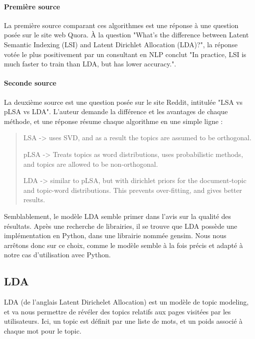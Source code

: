 			\paragraph{Première source} 

				La première source comparant ces algorithmes est une réponse à une question posée sur le site web Quora\cite{quora-topicmodel}. À la question "What's the difference between Latent Semantic Indexing (LSI) and Latent Dirichlet Allocation (LDA)?", la réponse votée le plus positivement par un consultant en NLP conclut "In practice, LSI is much faster to train than LDA, but has lower accuracy.".

			\paragraph{Seconde source}

				La deuxième source est une question posée sur le site Reddit, intitulée "LSA vs pLSA vs LDA"\cite{reddit-topicmodel}. L'auteur demande la différence et les avantages de chaque méthode, et une réponse résume chaque algorithme en une simple ligne :
				\begin{quote}
LSA -> uses SVD, and as a result the topics are assumed to be orthogonal.

pLSA -> Treats topics as word distributions, uses probabilistic methods, and topics are allowed to be non-orthogonal.

LDA -> similar to pLSA, but with dirichlet priors for the document-topic and topic-word distributions. This prevents over-fitting, and gives better results.
				\end{quote}

				Semblablement, le modèle LDA semble primer dans l'avis sur la qualité des résultats. Après une recherche de librairies, il se trouve que LDA possède une implémentation en Python, dans une librairie nommée gensim. Nous nous arrêtons donc sur ce choix, comme le modèle semble à la fois précis et adapté à notre cas d'utilisation avec Python.

	\subsection{LDA}\label{analyse-lda}

		LDA (de l'anglais Latent Dirichelet Allocation) est un modèle de topic modeling, et va nous permettre de révéler des topics relatifs aux pages visitées par les utilisateurs. Ici, un topic est définit par une liste de mots, et un poids associé à chaque mot pour le topic.

